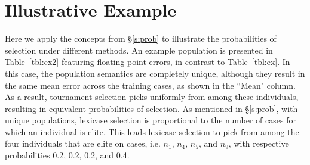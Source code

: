 \documentclass[twoside]{article}
\begin{document}
%
%
%


\section{Illustrative Example}\label{s:ex}
Here we apply the concepts from \S\ref{s:prob} to illustrate the probabilities of selection under different methods. An example population is presented in Table~\ref{tbl:ex2} featuring floating point errors, in contrast to Table~\ref{tbl:ex}. In this case, the population semantics are completely unique, although they result in the same mean error across the training cases, as shown in the ``Mean" column. As a result, tournament selection picks uniformly from among these individuals, resulting in equivalent probabilities of selection. As mentioned in \S\ref{s:prob}, with unique populations, lexicase selection is proportional to the number of cases for which an individual is elite. This leads lexicase selection to pick from among the four individuals that are elite on cases, i.e. $n_1$, $n_4$, $n_5$, and $n_9$, with respective probabilities 0.2, 0.2, 0.2, and 0.4. 
\end{document}
